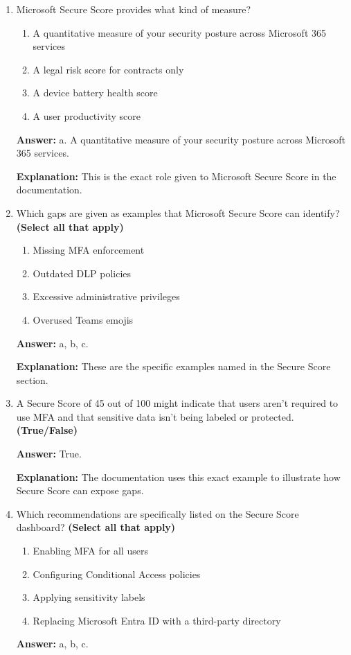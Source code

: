 \documentclass[10pt]{article}
\begin{document}
\begin{enumerate}[leftmargin=*]
\textbf{Explanation:} The documentation specifically identifies these two tools as starting points for assessment.

\item Microsoft Secure Score provides what kind of measure?
\begin{enumerate}[label=\alph*., leftmargin=1.5em]
\item A quantitative measure of your security posture across Microsoft 365 services
\item A legal risk score for contracts only
\item A device battery health score
\item A user productivity score
\end{enumerate}
\textbf{Answer:} a. A quantitative measure of your security posture across Microsoft 365 services.

\textbf{Explanation:} This is the exact role given to Microsoft Secure Score in the documentation.

\item Which gaps are given as examples that Microsoft Secure Score can identify? \textbf{(Select all that apply)}
\begin{enumerate}[label=\alph*., leftmargin=1.5em]
\item Missing MFA enforcement
\item Outdated DLP policies
\item Excessive administrative privileges
\item Overused Teams emojis
\end{enumerate}
\textbf{Answer:} a, b, c.

\textbf{Explanation:} These are the specific examples named in the Secure Score section.

\item A Secure Score of 45 out of 100 might indicate that users aren’t required to use MFA and that sensitive data isn’t being labeled or protected. \textbf{(True/False)}

\textbf{Answer:} True.

\textbf{Explanation:} The documentation uses this exact example to illustrate how Secure Score can expose gaps.

\item Which recommendations are specifically listed on the Secure Score dashboard? \textbf{(Select all that apply)}
\begin{enumerate}[label=\alph*., leftmargin=1.5em]
\item Enabling MFA for all users
\item Configuring Conditional Access policies
\item Applying sensitivity labels
\item Replacing Microsoft Entra ID with a third-party directory
\end{enumerate}
\textbf{Answer:} a, b, c.


\end{enumerate}
\end{document}

